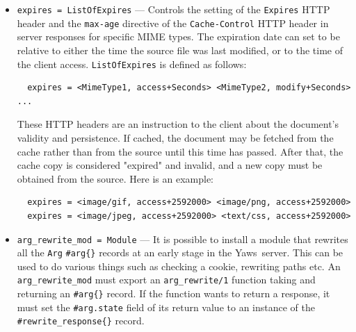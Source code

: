 \documentclass[11pt,oneside,english]{book}
\newcommand{\Yaws}            %
        {{\sc Yaws}}
\begin{document}
\begin{itemize}
              The function \verb+Module:crashmsg(Arg, SC, Str)+ will be
              called. The \verb+Str+ is the real crash message formatted as a
              string.

              The function must return, \verb+{content,MimeType,Cont}+ or
              \verb+{html, Str}+ or \verb+{ehtml, Term}+. That data will be
              shipped to the client.

\item       \verb+expires = ListOfExpires+ ---
              Controls the setting of the \verb+Expires+ HTTP header and the
              \verb+max-age+ directive of the \verb+Cache-Control+ HTTP header
              in server responses for specific MIME types. The expiration date
              can set to be relative to either the time the source file was last
              modified, or to the time of the client
              access. \verb+ListOfExpires+ is defined as follows:
\begin{verbatim}
  expires = <MimeType1, access+Seconds> <MimeType2, modify+Seconds> ...
\end{verbatim}
              These HTTP headers are an instruction to the client about the
              document's validity and persistence. If cached, the document may
              be fetched from the cache rather than from the source until this
              time has passed. After that, the cache copy is considered
              "expired" and invalid, and a new copy must be obtained from the
              source.
              Here is an example:
\begin{verbatim}
  expires = <image/gif, access+2592000> <image/png, access+2592000>
  expires = <image/jpeg, access+2592000> <text/css, access+2592000>
\end{verbatim}

\item       \verb+arg_rewrite_mod = Module+ ---
              It is possible to install a module that rewrites all the
              \verb+Arg+ \verb+#arg{}+ records at an early stage in the
              \Yaws\ server.  This can be used to do various things such as
              checking a cookie, rewriting paths etc. An
              \verb+arg_rewrite_mod+ must export an \verb+arg_rewrite/1+
              function taking and returning an \verb+#arg{}+ record. If the
              function wants to return a response, it must set the
              \verb+#arg.state+ field of its return value to an instance of
              the \verb+#rewrite_response{}+ record.


\end{itemize}
\end{document}
